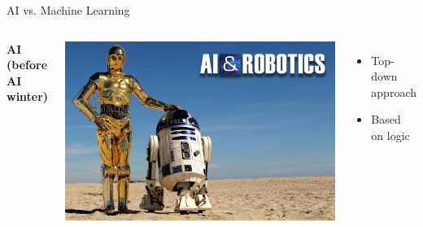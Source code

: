 \documentclass[aspectratio=169,10pt]{beamer}
\begin{document}
\begin{frame}{AI vs. Machine Learning}
	\begin{columns}[t]
		\begin{center}\textbf{AI (before AI winter)}\end{center}
		\includegraphics[width=\textwidth, clip]{images/ai_before}\\
		\begin{itemize}
			\item Top-down approach
			\item Based on logic
		\end{itemize}
	

\end{columns}
\end{frame}
\end{document}
